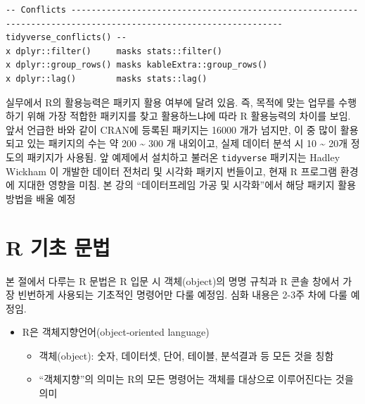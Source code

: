 \documentclass[
  11pt,
]{krantz}
\providecommand{\tightlist}{%
  \setlength{\itemsep}{0pt}\setlength{\parskip}{0pt}}
\let\BeginKnitrBlock\begin \let\EndKnitrBlock\end
\begin{document}
\begin{verbatim}
-- Conflicts ---------------------------------------------------------------------------------------------------------------- tidyverse_conflicts() --
x dplyr::filter()     masks stats::filter()
x dplyr::group_rows() masks kableExtra::group_rows()
x dplyr::lag()        masks stats::lag()
\end{verbatim}

\normalsize

\footnotesize

\BeginKnitrBlock{rmdnote}
실무에서 R의 활용능력은 패키지 활용 여부에 달려 있음. 즉, 목적에 맞는 업무를 수행하기 위해 가장 적합한 패키지를 찾고 활용하느냐에 따라 R 활용능력의 차이를 보임. 앞서 언급한 바와 같이 CRAN에 등록된 패키지는 16000 개가 넘지만, 이 중 많이 활용되고 있는 패키지의 수는 약 200 \textasciitilde{} 300 개 내외이고, 실제 데이터 분석 시 10 \textasciitilde{} 20개 정도의 패키지가 사용됨. 앞 예제에서 설치하고 불러온 \texttt{tidyverse} 패키지는 Hadley Wickham \citep{tidyverse2019}이 개발한 데이터 전처리 및 시각화 패키지 번들이고, 현재 R 프로그램 환경에 지대한 영향을 미침. 본 강의 ``데이터프레임 가공 및 시각화''에서 해당 패키지 활용 방법을 배울 예정
\EndKnitrBlock{rmdnote}

\normalsize

\hypertarget{r-basic}{%
\section{R 기초 문법}\label{r-basic}}

\footnotesize

\BeginKnitrBlock{rmdnote}
본 절에서 다루는 R 문법은 R 입문 시 객체(object)의 명명 규칙과 R 콘솔 창에서 가장 빈번하게 사용되는 기초적인 명령어만 다룰 예정임. 심화 내용은 2-3주 차에 다룰 예정임.
\EndKnitrBlock{rmdnote}

\normalsize

\begin{itemize}
\tightlist
\item
  R은 객체지향언어(object-oriented language)

  \begin{itemize}
  \tightlist
  \item
    객체(object): 숫자, 데이터셋, 단어, 테이블, 분석결과 등 모든 것을 칭함
  \item
    ``객체지향''의 의미는 R의 모든 명령어는 객체를 대상으로 이루어진다는 것을 의미
  \end{itemize}
\end{itemize}
\end{document}
